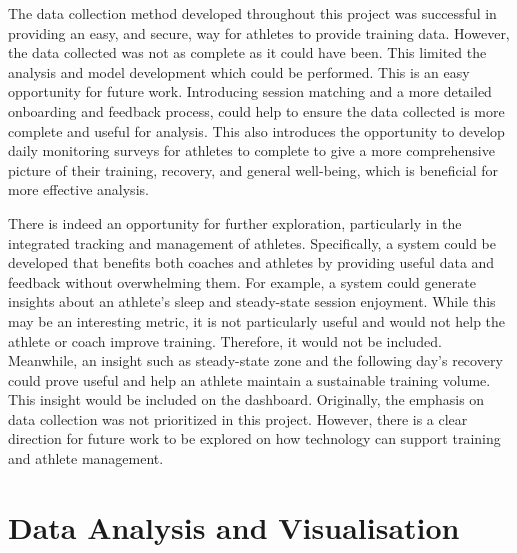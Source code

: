 The data collection method developed throughout this project was successful in providing an easy, and secure, way for athletes to provide training data. However, the data collected was not as complete as it could have been. This limited the analysis and model development which could be performed. This is an easy opportunity for future work. Introducing session matching and a more detailed onboarding and feedback process, could help to ensure the data collected is more complete and useful for analysis. This also introduces the opportunity to develop daily monitoring surveys for athletes to complete to give a more comprehensive picture of their training, recovery, and general well-being, which is beneficial for more effective analysis.

There is indeed an opportunity for further exploration, particularly in the integrated tracking and management of athletes. Specifically, a system could be developed that benefits both coaches and athletes by providing useful data and feedback without overwhelming them. For example, a system could generate insights about an athlete's sleep and steady-state session enjoyment. While this may be an interesting metric, it is not particularly useful and would not help the athlete or coach improve training. Therefore, it would not be included. Meanwhile, an insight such as steady-state zone and the following day's recovery could prove useful and help an athlete maintain a sustainable training volume. This insight would be included on the dashboard. Originally, the emphasis on data collection was not prioritized in this project. However, there is a clear direction for future work to be explored on how technology can support training and athlete management.

\section{\label{sec:data-anyl-diss}Data Analysis and Visualisation}
